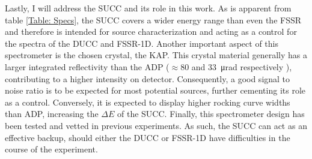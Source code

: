 Lastly, I will address the SUCC and its role in this work. As is apparent from table 
\ref{Table: Specs}, the SUCC covers a wider energy range than even the FSSR and 
therefore is intended for source characterization and acting as a control for the 
spectra of the DUCC and FSSR-1D. Another important aspect of this spectrometer is the 
chosen crystal, the KAP. This crystal material generally has a larger integrated 
reflectivity than the ADP ($\approx$80 and \SI{33}{\micro\radian} respectively 
\citep{gilfrich1975integral}), contributing to a 
higher intensity on detector. Consequently, a good signal to noise ratio is to be 
expected for most potential sources, further cementing its role as a control. Conversely, it is expected to display higher rocking curve widths than ADP, increasing the $\Delta E$ of the SUCC. Finally, 
this spectrometer design has been tested and vetted in previous experiments. As such, 
the SUCC can act as an effective backup, should either the DUCC or FSSR-1D have 
difficulties in the course of the experiment. 

